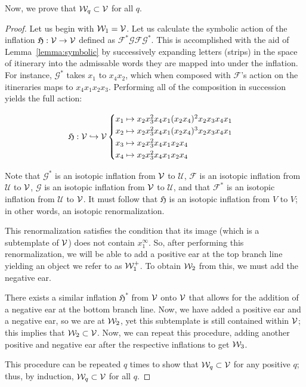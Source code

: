\documentclass[paper.tex]{subfiles}
\begin{document}
Now, we prove that $\mathcal{W}_q \subset \mathcal{V}$ for all $q$.

\begin{proof}
    Let us begin with $\mathcal{W}_1 = \mathcal{V}$. Let us calculate the symbolic action of the inflation $\mathfrak{H}: \mathcal{V} \to \mathcal{V}$ defined as $\mathcal{F}^* \mathcal{G} \mathcal{F} \mathcal{G}^*$. This is accomplished with the aid of Lemma~\ref{lemma:symbolic} by successively expanding
letters (strips) in the space of itinerary into the admissable words they are mapped into under the inflation.
For instance, $\mathcal{G}^\ast$ takes $x_1$ to $x_4 x_2$, which when composed with $\mathcal{F}$'s action on the itineraries maps to $x_4 x_1 x_2 x_3$. Performing all of the composition in succession yields the full action:

    $$\mathfrak{H}: \mathcal{V} \hookrightarrow \mathcal{V} \begin{cases}
        x_1 \mapsto x_2 x_3^2 x_4 x_1 (x_2 x_4)^2 x_2 x_3 x_4 x_1 \\
        x_2 \mapsto x_2 x_3^2 x_4 x_1 (x_2 x_4)^3 x_2 x_3 x_4 x_1 \\
        x_3 \mapsto x_2 x_3^2 x_4 x_1  x_2 x_4  \\
        x_4 \mapsto x_2 x_3^2 x_4 x_1  x_2 x_4  \end{cases} $$

        Note that $\mathcal{G}^*$ is an isotopic inflation from $\mathcal{V}$ to $\mathcal{U}$, $\mathcal{F}$ is an isotopic inflation from $\mathcal{U}$ to $\mathcal{V}$, $\mathcal{G}$ is an isotopic inflation from $\mathcal{V}$ to $\mathcal{U}$, and that $\mathcal{F}^*$ is an isotopic inflation from $\mathcal{U}$ to $\mathcal{V}$. It must follow that $\mathfrak{H}$ is an isotopic inflation from $V$ to $V$; in other words, an isotopic renormalization.

        This renormalization satisfies the condition that its image (which is a subtemplate of $\mathcal{V}$) does not contain $x_1^\infty$. So, after performing this renormalization, we will be able to add a positive ear at the top branch line
        yielding an object we refer to as $\mathcal{W}_1^+$. To obtain $\mathcal{W}_2$ from this, we must add the negative ear.

        There exists a similar inflation $\mathfrak{H}^*$ from $\mathcal{V}$ onto $\mathcal{V}$ that allows for the addition of a negative ear at the bottom branch line. Now, we have added a positive ear and a negative ear, so we are at $\mathcal{W}_2$, yet this subtemplate is still contained within $\mathcal{V}$; this implies that $\mathcal{W}_2 \subset \mathcal{V}$. Now, we can repeat this procedure, adding another positive and negative ear after the respective inflations to get $\mathcal{W}_3$.

        This procedure can be repeated $q$ times to show that $\mathcal{W}_q \subset \mathcal{V}$ for any positive $q$; thus, by induction, $\mathcal{W}_q \subset \mathcal{V}$ for all $q$.
    \end{proof}
\end{document}
